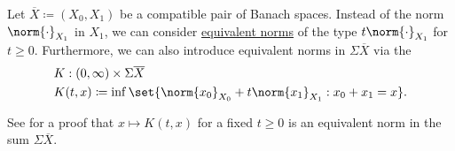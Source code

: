 \begin{definition}\label{def:k_functional}
  Let \( \overline{X} \coloneqq ( X_0, X_1 ) \) be a compatible pair of Banach spaces. Instead of the norm \( \norm{\cdot}_{X_1} \) in \( X_1 \), we can consider \hyperref[def:equivalent_metrics]{equivalent norms} of the type \( t\norm{\cdot}_{X_1} \) for \( t \geq 0 \). Furthermore, we can also introduce equivalent norms in \( \Sigma \overline{X} \) via the 
  \begin{equation}\label{eq:def:k_functional}
    \begin{aligned}
      &K: (0, \infty) \times {\Sigma \overline{X}} \\
      &K(t, x) \coloneqq \inf \set{ \norm{x_0}_{X_0} + t\norm{x_1}_{X_1} : x_0 + x_1 = x }.
    \end{aligned}
  \end{equation}

  See  for a proof that \( x \mapsto K(t, x) \) for a fixed \( t \geq 0 \) is an equivalent norm in the sum \( \Sigma \overline{X} \).
\end{definition}

